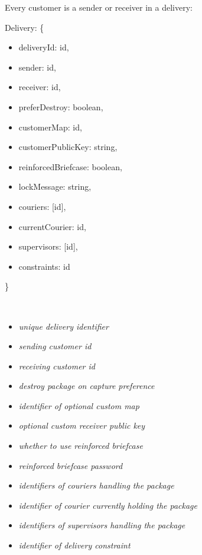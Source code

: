 \begin{flushleft}
Every customer is a sender or receiver in a delivery: 
\end{flushleft}
\begin{minipage}{6.5cm}
    Delivery: \{
    \begin{itemize}
        \itemsep-0.5em
        \item[] deliveryId: id,
        \item[] sender: id,
        \item[] receiver: id,
        \item[] preferDestroy: boolean,
        \item[] customerMap: id,
        \item[] customerPublicKey: string,
        \item[] reinforcedBriefcase: boolean,
        \item[] lockMessage: string,
        \item[] couriers: [id],
        \item[] currentCourier: id,
        \item[]  supervisors: [id],
        \item[] constraints: id
    \end{itemize}
    \}
\end{minipage}
\begin{minipage}{10cm}
    \hspace{1cm} \\
    \begin{itemize}
        \itemsep-0.5em
        \item[] \textit{unique delivery identifier}
        \item[] \textit{sending customer id}
        \item[] \textit{receiving customer id}
        \item[] \textit{destroy package on capture preference}
        \item[] \textit{identifier of optional custom map}
        \item[] \textit{optional custom receiver public key}
        \item[] \textit{whether to use reinforced briefcase}
        \item[] \textit{reinforced briefcase password}
        \item[] \textit{identifiers of couriers handling the package}
        \item[] \textit{identifier of courier currently holding the package}
        \item[]  \textit{identifiers of supervisors handling the package}
        \item[] \textit{identifier of delivery constraint}
    \end{itemize}
    \hspace{1cm} \\
\end{minipage}
